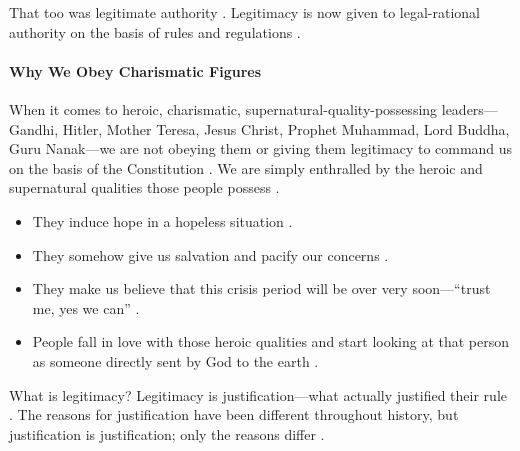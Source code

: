 That too was legitimate authority . Legitimacy is now given to legal-rational authority on the basis of rules and regulations .

\paragraph{Why We Obey Charismatic Figures}
When it comes to heroic, charismatic, supernatural-quality-possessing leaders---Gandhi, Hitler, Mother Teresa, Jesus Christ, Prophet Muhammad, Lord Buddha, Guru Nanak---we are not obeying them or giving them legitimacy to command us on the basis of the Constitution . We are simply enthralled by the heroic and supernatural qualities those people possess .
\begin{itemize}
    \item They induce hope in a hopeless situation .
    \item They somehow give us salvation and pacify our concerns .
    \item They make us believe that this crisis period will be over very soon---``trust me, yes we can'' .
    \item People fall in love with those heroic qualities and start looking at that person as someone directly sent by God to the earth .
\end{itemize}

\begin{KeyConcept}
What is legitimacy? Legitimacy is justification---what actually justified their rule .
The reasons for justification have been different throughout history, but justification is justification; only the reasons differ .
\end{KeyConcept}

